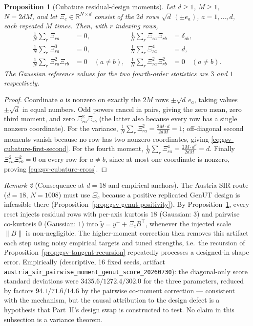 \documentclass[11pt]{article}
\newtheorem{proposition}{Proposition}[section]
\theoremstyle{definition}
\theoremstyle{remark}
\newtheorem{remark}[proposition]{Remark}
\begin{document}
\begin{proposition}[Cubature residual-design moments]
\label{prop:gsv-cubature-design-moments}
Let $d\ge1$, $M\ge1$, $N=2dM$, and let
$\Xi_c\in\mathbb{R}^{N\times d}$ consist of the $2d$ rows
$\sqrt{d}\,(\pm e_a)$, $a=1,\dots,d$, each repeated $M$ times.  Then, with
$r$ indexing rows,
\begin{align}
 \frac1N\sum_{r}\Xi_{ra}&=0,
 &\frac1N\sum_{r}\Xi_{ra}\Xi_{rb}&=\delta_{ab},
 \label{eq:gsv-cubature-first-second}\\
 \frac1N\sum_{r}\Xi_{ra}^{3}&=0,
 &\frac1N\sum_{r}\Xi_{ra}^{4}&=d,
 \label{eq:gsv-cubature-fourth}\\
 \frac1N\sum_{r}\Xi_{ra}^{2}\Xi_{rb}&=0\quad(a\neq b),
 &\frac1N\sum_{r}\Xi_{ra}^{2}\Xi_{rb}^{2}&=0\quad(a\neq b).
 \label{eq:gsv-cubature-cross}
\end{align}
The Gaussian reference values for the two fourth-order statistics are $3$
and $1$ respectively.
\end{proposition}

\begin{proof}
Coordinate $a$ is nonzero on exactly the $2M$ rows $\pm\sqrt d\,e_a$, taking
values $\pm\sqrt d$ in equal numbers.  Odd powers cancel in pairs, giving the
zero mean, zero third moment, and zero $\Xi_{ra}^2\Xi_{rb}$ (the latter also
because every row has a single nonzero coordinate).  For the variance,
$\tfrac1N\sum_r\Xi_{ra}^2=\tfrac{2M\cdot d}{2dM}=1$; off-diagonal second
moments vanish because no row has two nonzero coordinates, giving
\eqref{eq:gsv-cubature-first-second}.  For the fourth moment,
$\tfrac1N\sum_r\Xi_{ra}^4=\tfrac{2M\cdot d^{2}}{2dM}=d$.  Finally
$\Xi_{ra}^2\Xi_{rb}^2=0$ on every row for $a\neq b$, since at most one
coordinate is nonzero, proving \eqref{eq:gsv-cubature-cross}.
\end{proof}

\begin{remark}[Consequence at $d=18$ and empirical anchors]
\label{rem:gsv-defect-consequence}
The Austria SIR route ($d=18$, $N=1008$) must use $\Xi_c$ because a positive
replicated GenUT design is infeasible there
(Proposition~\ref{prop:gsv-genut-positivity}).  By
Proposition~\ref{prop:gsv-cubature-design-moments}, every reset injects
residual rows with per-axis kurtosis $18$ (Gaussian: $3$) and pairwise
co-kurtosis $0$ (Gaussian: $1$) into
$\widetilde y=y^{+}+\Xi_c B^{\top}$, whenever the injected scale
$\lVert B\rVert$ is non-negligible.  The higher-moment correction then
removes this artifact each step using noisy empirical targets and tuned
strengths, i.e.\ the recursion of
Proposition~\ref{prop:gsv-tangent-recursion} repeatedly processes a
designed-in shape error.  Empirically (descriptive, 16 fixed seeds, artifact
\texttt{austria\_sir\_pairwise\_moment\_genut\_score\_20260730}): the
diagonal-only score standard deviations were
$3435.6/1272.4/302.0$ for the three parameters, reduced by factors
$94.1/71.6/14.6$ by the pairwise co-moment correction --- consistent with the
mechanism, but the causal attribution to the design defect is a hypothesis
that Part~II's design swap is constructed to test.  No claim in this
subsection is a variance theorem.
\end{remark}
\end{document}
